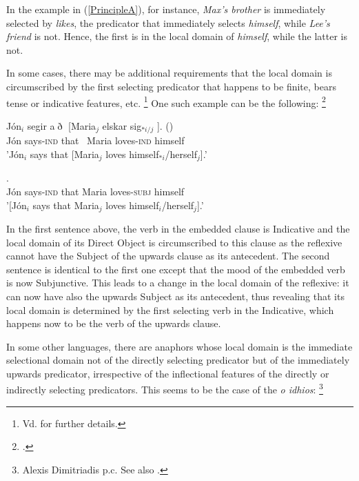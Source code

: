 \documentclass[output=paper
,modfonts
,nonflat]{langsci/langscibook}
\begin{document}
In the example in (\ref{PrincipleA}), for instance, {\em Max's brother} is immediately 
selected by {\em likes}, the predicator that immediately selects {\em himself}, while {\em Lee's friend}
is not. Hence, the first is in the local domain of {\em himself}, while the latter is not.

In some cases, there may be additional requirements that the local domain
is circumscribed by the first selecting predicator that happens to be finite, 
bears tense or indicative features, etc.%
%
\footnote{
Vd. \citep{manziniWexler:parameters87, kosterReuland:longdistance91, dal:bind93} for further details.
}
One such example can be the following:%
%
\footnote{
\citep[]{manziniWexler:parameters87}.}


\begin{exe}
\ex
\begin{xlist}
\ex
\gll J\'{o}n$_{i}$ segir a$\eth$ [Maria$_{j}$ elskar sig$_{*i/j}$ ]. ()\\
J\'{o}n says-\textsc{ind} that \mbox{ }Maria loves-\textsc{ind} himself\\
\trans 'J\'{o}n$_{i}$ says that [Maria$_{j}$ loves himself$_{*i}$/herself$_{j}$].'

\ex
{}.\\
J\'{o}n says-\textsc{ind} that Maria loves-\textsc{subj} himself\\
\trans '[J\'{o}n$_{i}$ says that Maria$_{j}$ loves himself$_{i}$/herself$_{j}$].'
\end{xlist}
\end{exe}


In the first sentence above, the verb in the embedded clause is
Indicative and the local domain of its Direct Object is circumscribed
to this clause as the reflexive cannot have the Subject of the upwards
clause as its antecedent. The second sentence is identical to the first
one except that the mood of the embedded verb is now Subjunctive. This leads
to a change in the local domain of the reflexive: it can now have also the upwards
Subject as its antecedent, thus revealing that its local domain is determined
by the first selecting verb in the Indicative, which happens now to be the
verb of the upwards clause.


In some other languages, there are anaphors whose local domain
is the immediate selectional domain not of the directly selecting predicator
but of the immediately upwards predicator,  irrespective of the
inflectional features of the directly or indirectly selecting predicators. 
This seems to be the case of the  {\it o idhios}:%
%
\footnote{
Alexis Dimitriadis p.c. See also \citep{iatridou:86, varlokostaHornstein:93}. }
\end{document}
